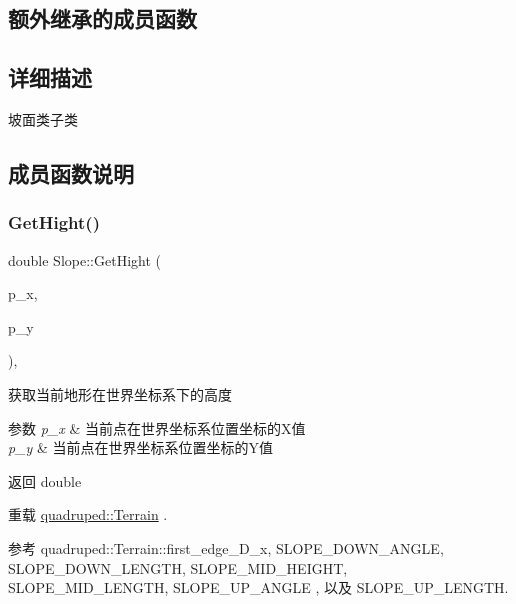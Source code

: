 \subsection*{额外继承的成员函数}


\subsection{详细描述}
坡面类子类 

\subsection{成员函数说明}
\mbox{\label{classquadruped_1_1Slope_a964d5d93a7f650eaaa10028a17cc81a4}} 
\subsubsection{\texorpdfstring{Get\+Hight()}{GetHight()}}
{\footnotesize\ttfamily double Slope\+::\+Get\+Hight (\begin{DoxyParamCaption}\item[{double}]{p\+\_\+x,  }\item[{double}]{p\+\_\+y }\end{DoxyParamCaption})\hspace{0.3cm}{\ttfamily [override]}, {\ttfamily [virtual]}}



获取当前地形在世界坐标系下的高度 


\begin{DoxyParams}{参数}
{\em p\+\_\+x} & 当前点在世界坐标系位置坐标的\+X值 \\
\hline
{\em p\+\_\+y} & 当前点在世界坐标系位置坐标的\+Y值 \\
\hline
\end{DoxyParams}
\begin{DoxyReturn}{返回}
double 
\end{DoxyReturn}


重载 \hyperlink{classquadruped_1_1Terrain}{quadruped\+::\+Terrain} .



参考 quadruped\+::\+Terrain\+::first\+\_\+edge\+\_\+\+D\+\_\+x, S\+L\+O\+P\+E\+\_\+\+D\+O\+W\+N\+\_\+\+A\+N\+G\+LE, S\+L\+O\+P\+E\+\_\+\+D\+O\+W\+N\+\_\+\+L\+E\+N\+G\+TH, S\+L\+O\+P\+E\+\_\+\+M\+I\+D\+\_\+\+H\+E\+I\+G\+HT, S\+L\+O\+P\+E\+\_\+\+M\+I\+D\+\_\+\+L\+E\+N\+G\+TH, S\+L\+O\+P\+E\+\_\+\+U\+P\+\_\+\+A\+N\+G\+LE , 以及 S\+L\+O\+P\+E\+\_\+\+U\+P\+\_\+\+L\+E\+N\+G\+TH.

